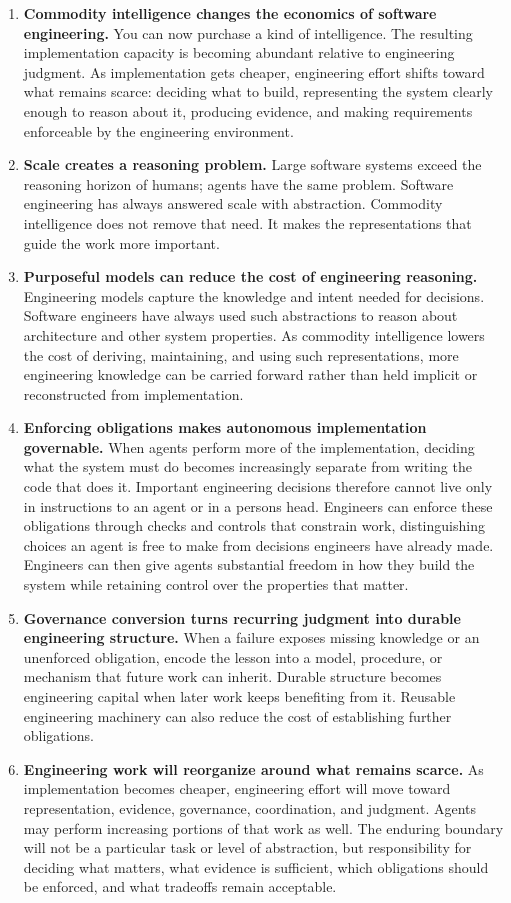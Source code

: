 \begin{enumerate}
\def\labelenumi{\arabic{enumi}.}
\tightlist
\item
  \textbf{Commodity intelligence changes the economics of software engineering.} You can now purchase a kind of intelligence. The resulting implementation capacity is becoming abundant relative to engineering judgment. As implementation gets cheaper, engineering effort shifts toward what remains scarce: deciding what to build, representing the system clearly enough to reason about it, producing evidence, and making requirements enforceable by the engineering environment.
\item
  \textbf{Scale creates a reasoning problem.} Large software systems exceed the reasoning horizon of humans; agents have the same problem. Software engineering has always answered scale with abstraction. Commodity intelligence does not remove that need. It makes the representations that guide the work more important.
\item
  \textbf{Purposeful models can reduce the cost of engineering reasoning.} Engineering models capture the knowledge and intent needed for decisions. Software engineers have always used such abstractions to reason about architecture and other system properties. As commodity intelligence lowers the cost of deriving, maintaining, and using such representations, more engineering knowledge can be carried forward rather than held implicit or reconstructed from implementation.
\item
  \textbf{Enforcing obligations makes autonomous implementation governable.} When agents perform more of the implementation, deciding what the system must do becomes increasingly separate from writing the code that does it. Important engineering decisions therefore cannot live only in instructions to an agent or in a person\textquotesingle s head. Engineers can enforce these obligations through checks and controls that constrain work, distinguishing choices an agent is free to make from decisions engineers have already made. Engineers can then give agents substantial freedom in how they build the system while retaining control over the properties that matter.
\item
  \textbf{Governance conversion turns recurring judgment into durable engineering structure.} When a failure exposes missing knowledge or an unenforced obligation, encode the lesson into a model, procedure, or mechanism that future work can inherit. Durable structure becomes engineering capital when later work keeps benefiting from it. Reusable engineering machinery can also reduce the cost of establishing further obligations.
\item
  \textbf{Engineering work will reorganize around what remains scarce.} As implementation becomes cheaper, engineering effort will move toward representation, evidence, governance, coordination, and judgment. Agents may perform increasing portions of that work as well. The enduring boundary will not be a particular task or level of abstraction, but responsibility for deciding what matters, what evidence is sufficient, which obligations should be enforced, and what tradeoffs remain acceptable.
\end{enumerate}

